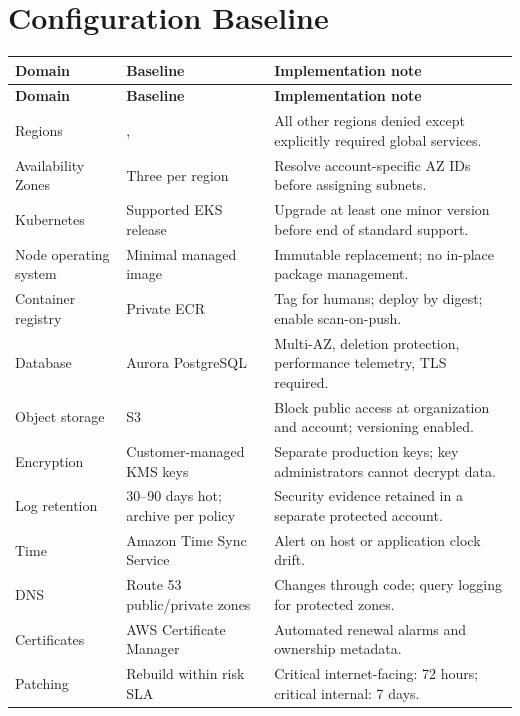 \section{Configuration Baseline}

\begin{longtable}{@{}L{34mm}L{43mm}L{76mm}@{}}
  \toprule
  \color{white}\textbf{Domain} & \color{white}\textbf{Baseline} & \color{white}\textbf{Implementation note} \\
  \midrule
  \endfirsthead
  \toprule
  \color{white}\textbf{Domain} & \color{white}\textbf{Baseline} & \color{white}\textbf{Implementation note} \\
  \midrule
  \endhead
  Regions & ,  & All other regions denied except explicitly required global services. \\
  Availability Zones & Three per region & Resolve account-specific AZ IDs before assigning subnets. \\
  Kubernetes & Supported EKS release & Upgrade at least one minor version before end of standard support. \\
  Node operating system & Minimal managed image & Immutable replacement; no in-place package management. \\
  Container registry & Private ECR & Tag for humans; deploy by digest; enable scan-on-push. \\
  Database & Aurora PostgreSQL & Multi-AZ, deletion protection, performance telemetry, TLS required. \\
  Object storage & S3 & Block public access at organization and account; versioning enabled. \\
  Encryption & Customer-managed KMS keys & Separate production keys; key administrators cannot decrypt data. \\
  Log retention & 30--90 days hot; archive per policy & Security evidence retained in a separate protected account. \\
  Time & Amazon Time Sync Service & Alert on host or application clock drift. \\
  DNS & Route 53 public/private zones & Changes through code; query logging for protected zones. \\
  Certificates & AWS Certificate Manager & Automated renewal alarms and ownership metadata. \\
  Patching & Rebuild within risk SLA & Critical internet-facing: 72 hours; critical internal: 7 days. \\
  \bottomrule
\end{longtable}
